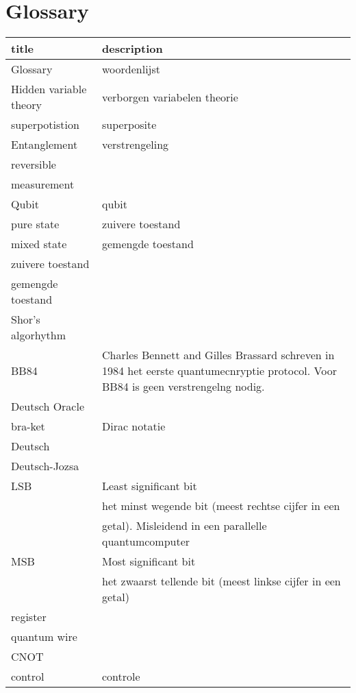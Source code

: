 \documentclass[../../main.tex]{subfiles}
\begin{document}
\onlyinsubfile{\setcounter{chapter}{8}}
\notinsubfile{}
\section*{Glossary}
\onlyinsubfile{
}
\notinsubfile{
}


\begin{table}[h!]
\leavevmode
\begin{tabular}{|l|l|}
\hline
title & description  \\ \hline
Glossary & woordenlijst \\ \hline

Hidden variable theory & verborgen variabelen theorie\\
superpotistion & superposite\\
Entanglement & verstrengeling\\
reversible&\\
measurement&\\
Qubit & qubit\\
pure state & zuivere toestand\\
mixed state& gemengde toestand\\
zuivere toestand& \\
gemengde toestand&\\

Shor's algorhythm&\\
BB84 & Charles Bennett and Gilles Brassard schreven in 1984 het eerste quantumecnryptie protocol. Voor BB84 is geen verstrengelng nodig.\\

Deutsch Oracle & \\
bra-ket & Dirac notatie\\
Deutsch&\\
Deutsch-Jozsa&\\

LSB & Least significant bit \\
 & het minst wegende bit (meest rechtse cijfer in een\\
 & getal). Misleidend in een parallelle quantumcomputer\\

MSB & Most significant bit \\
& het zwaarst tellende bit (meest linkse cijfer in een getal)\\
register&\\
quantum wire&\\
CNOT&\\
control & controle\\


\end{tabular}
\end{table}
\end{document}
